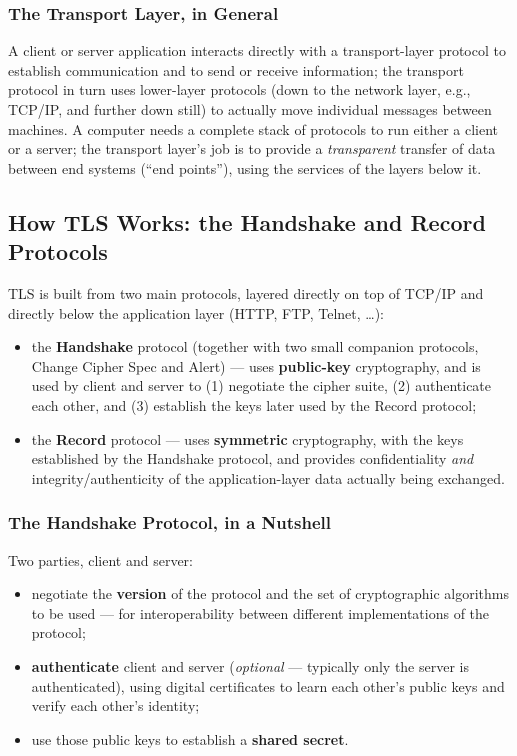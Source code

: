 \documentclass[12pt, a4paper]{article}
\begin{document}
\subsubsection{The Transport Layer, in General}
A client or server application interacts directly with a transport-layer protocol to establish communication and to send or receive information; the transport protocol in turn uses lower-layer protocols (down to the network layer, e.g., TCP/IP, and further down still) to actually move individual messages between machines. A computer needs a complete stack of protocols to run either a client or a server; the transport layer's job is to provide a \emph{transparent} transfer of data between end systems (``end points''), using the services of the layers below it.

\subsection{How TLS Works: the Handshake and Record Protocols}
\label{subsec:tls-protocols-05}

TLS is built from two main protocols, layered directly on top of TCP/IP and directly below the application layer (HTTP, FTP, Telnet, \dots):
\begin{itemize}
    \item the \textbf{Handshake} protocol (together with two small companion protocols, Change Cipher Spec and Alert) --- uses \textbf{public-key} cryptography, and is used by client and server to (1) negotiate the cipher suite, (2) authenticate each other, and (3) establish the keys later used by the Record protocol;
    \item the \textbf{Record} protocol --- uses \textbf{symmetric} cryptography, with the keys established by the Handshake protocol, and provides confidentiality \emph{and} integrity/authenticity of the application-layer data actually being exchanged.
\end{itemize}

\subsubsection{The Handshake Protocol, in a Nutshell}
Two parties, client and server:
\begin{itemize}
    \item negotiate the \textbf{version} of the protocol and the set of cryptographic algorithms to be used --- for interoperability between different implementations of the protocol;
    \item \textbf{authenticate} client and server (\emph{optional} --- typically only the server is authenticated), using digital certificates to learn each other's public keys and verify each other's identity;
    \item use those public keys to establish a \textbf{shared secret}.
\end{itemize}
\end{document}
